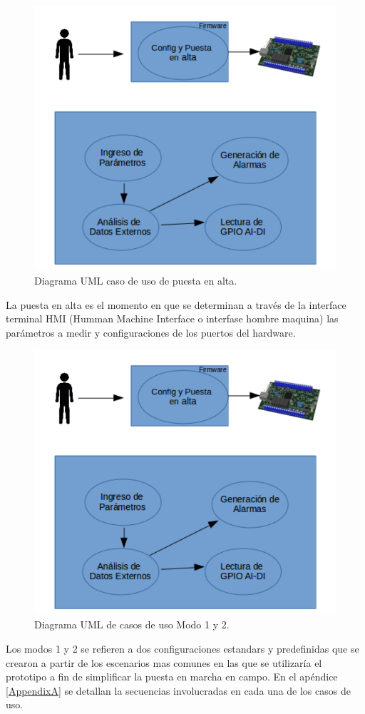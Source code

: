 \begin{figure}[h!]
	\centering
	\includegraphics[width=.7\textwidth]{Figures/Cap_2/caso_uso_Alta_UML}
	\caption{Diagrama UML caso de uso de puesta en alta.}
	\label{fig:casoUsoAlta}
\end{figure}

La puesta en alta es el momento en que se determinan a través de la interface terminal HMI (Humman Machine Interface o interfase hombre maquina) las parámetros a medir y configuraciones de los puertos del hardware.

\begin{figure}[h!]
	\centering
	\includegraphics[width=.7\textwidth]{Figures/Cap_2/caso_uso_1y2_UML}
	\caption{Diagrama UML de casos de uso Modo 1 y 2.}
	\label{fig:casodeUso1y2}
\end{figure}

Los modos 1 y 2 se refieren a dos configuraciones estandars y predefinidas que se crearon a partir de los escenarios mas comunes en las que se utilizaría el prototipo a fin de simplificar la puesta en marcha en campo.
En el apéndice \ref{AppendixA} se detallan la secuencias involucradas en cada una de los casos de uso.

